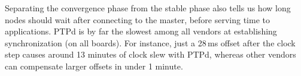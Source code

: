 
Separating the convergence phase from the stable phase also tells us how long
nodes should wait after connecting to the master,
before serving time to applications.
PTPd is by far the slowest among all vendors at establishing synchronization
(on all boards).
For instance, just a 28\,ms offset after the clock step causes around 13 minutes
of clock slew with PTPd, whereas other vendors can compensate larger offsets
in under 1 minute.


